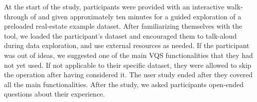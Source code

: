   \par At the start of the  study, participants were provided with an interactive walk-through of \zvpp and given approximately ten minutes for a guided exploration of a preloaded real-estate example dataset. After familiarizing themselves with the tool, we loaded the participant's dataset and encouraged them to talk-aloud during data exploration, and use external resources as needed. If the participant was out of ideas, we suggested one of the main VQS functionalities that they had not yet used. If  not applicable to their specific dataset, they were allowed to skip the operation after having considered it. The user study  ended after they covered all the main functionalities. After the study, we asked participants open-ended questions about their experience.%